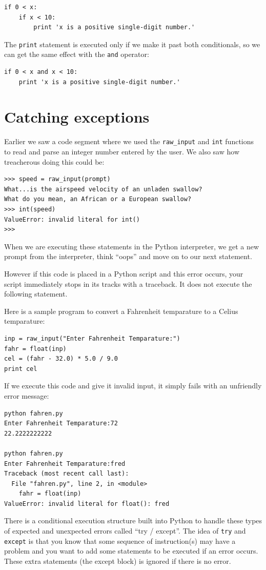 \documentclass[10pt]{book}
\begin{document}
\beforeverb
\begin{verbatim}
if 0 < x:
    if x < 10:
        print 'x is a positive single-digit number.'
\end{verbatim}
\afterverb
%
The {\tt print} statement is executed only if we make it past both
conditionals, so we can get the same effect with the {\tt and} operator:

\beforeverb
\begin{verbatim}
if 0 < x and x < 10:
    print 'x is a positive single-digit number.'
\end{verbatim}
\afterverb


\section{Catching exceptions}
\label{catch1}

Earlier we saw a code segment where we used the \verb"raw_input" and
{\tt int} functions to read and parse an integer number entered by
the user.  We also saw how treacherous doing this could be:

\beforeverb
\begin{verbatim}
>>> speed = raw_input(prompt)
What...is the airspeed velocity of an unladen swallow?
What do you mean, an African or a European swallow?
>>> int(speed)
ValueError: invalid literal for int()
>>>
\end{verbatim}
\afterverb
%
When we are executing these statements in the Python interpreter, 
we get a new prompt from the interpreter, think ``oops'' and move 
on to our next statement.  

However if this code is placed in a 
Python script and this error occurs, your script immediately 
stops in its tracks with a traceback.  
It does not execute the following statement. 

Here is a sample program to convert a Fahrenheit temparature 
to a Celius temparature:

\beforeverb
\begin{verbatim}
inp = raw_input("Enter Fahrenheit Temparature:")
fahr = float(inp)
cel = (fahr - 32.0) * 5.0 / 9.0
print cel
\end{verbatim}
\afterverb
%
If we execute this code and give it invalid input, it simply fails
with an unfriendly error message:

\beforeverb
\begin{verbatim}
python fahren.py 
Enter Fahrenheit Temparature:72
22.2222222222

python fahren.py 
Enter Fahrenheit Temparature:fred
Traceback (most recent call last):
  File "fahren.py", line 2, in <module>
    fahr = float(inp)
ValueError: invalid literal for float(): fred
\end{verbatim}
\afterverb
%
There is a conditional execution structure built into 
Python to handle these types of expected and unexpected
errors called ``try / except''.  The idea of {\tt try}
and {\tt except} is that you know that some sequence
of instruction(s) may have a problem and you want to 
add some statements to be executed if an error occurs.
These extra statements (the except block) is ignored
if there is no error.
\end{document}
